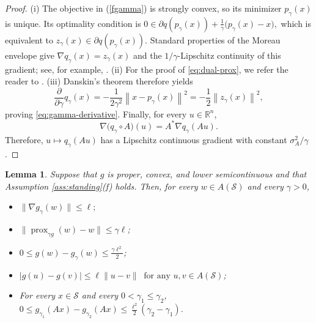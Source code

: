 \documentclass[9pt]{article}
\numberwithin{equation}{section}
\newtheorem{lemma}[theorem]{Lemma}
\theoremstyle{definition}
\theoremstyle{remark}
\newcommand{\R}{\mathbb R}
\newcommand{\Sset}{\mathcal S}
\newcommand{\norm}[1]{\left\lVert #1\right\rVert}
\DeclareMathOperator{\prox}{prox}
\begin{document}
\begin{proof}
(i) The objective in (\ref{fgamma}) is strongly convex, so its minimizer
$p_\gamma(x)$ is unique.  Its optimality condition is
$
    0\in\partial q(p_\gamma(x))
      +\frac1\gamma\bigl(p_\gamma(x)-x\bigr),
$
which is equivalent to
$z_\gamma(x)\in\partial q(p_\gamma(x))$.  Standard properties of the Moreau
envelope give
$\nabla q_\gamma(x)=z_\gamma(x)$ and the
$1/\gamma$-Lipschitz continuity of this gradient; see, for example,
\cite[Chapter~12]{BauschkeCombettes2017}.
(ii) For the proof of \eqref{eq:dual-prox}, we refer the reader to \cite{BotBohm2020}.
(iii) Danskin's
theorem therefore yields
\[
 \frac{\partial}{\partial\gamma}q_\gamma(x)
 =-\frac{1}{2\gamma^2}\norm{x-p_\gamma(x)}^2
 =-\frac12\norm{z_\gamma(x)}^2,
\]
proving \eqref{eq:gamma-derivative}.
Finally, for every $u\in\R^n$,
\[
 \nabla\bigl(q_\gamma\circ A\bigr)(u)
 =A^*\nabla q_\gamma(Au).
\]
Therefore, $u\mapsto q_\gamma(Au)$ has a Lipschitz continuous gradient
with constant $\sigma_A^2/\gamma$.
\end{proof}

\begin{lemma}
\label{lem:uniform-moreau}
Suppose that $g$ is proper, convex, and lower semicontinuous and that Assumption \ref{ass:standing}(f) holds.
Then, for every $w\in A(\mathcal S)$ and every $\gamma>0$,
\begin{itemize}
\item[(i)]
$\|\nabla g_\gamma(w)\|\leq\ell;$
\label{eq:uniform-gradient-bound}
\item[(ii)]
$
\|\prox_{\gamma g}(w)-w\|\leq\gamma\ell$;
\label{eq:uniform-proximal-bound}
\item[(iii)]
$0\leq g(w)-g_\gamma(w)\leq\frac{\gamma\ell^2}{2}$;

\item[(iv)]
$|g(u)-g(v)|\leq\ell\|u-v\|
\;\;\text{for any }u,v\in A(\mathcal S)$;
\item[(v)]
For  every $x\in\Sset$ and every $0<\gamma_1\leq\gamma_2$,
$
 0\leq g_{\gamma_1}(Ax)-g_{\gamma_2}(Ax)
 \leq\frac{\ell^2}{2}(\gamma_2-\gamma_1)$.

\end{itemize}
\end{lemma}
\end{document}
